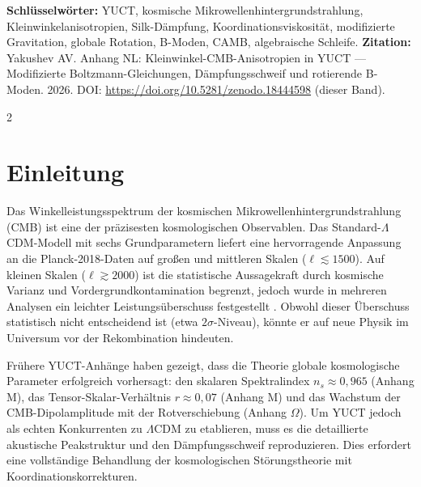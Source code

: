 \documentclass[11pt,a4paper]{article}
\begin{document}
	\vspace{0.1cm}
	\noindent
	{\color{darkblue}\textbf{Schlüsselwörter:}} YUCT, kosmische Mikrowellenhintergrundstrahlung, Kleinwinkelanisotropien, Silk-Dämpfung, Koordinationsviskosität, modifizierte Gravitation, globale Rotation, B-Moden, CAMB, algebraische Schleife.
	\vspace{0.1cm}
	\noindent
	{\color{darkblue}\textbf{Zitation:}} Yakushev AV. Anhang NL: Kleinwinkel-CMB-Anisotropien in YUCT — Modifizierte Boltzmann-Gleichungen, Dämpfungsschweif und rotierende B-Moden. 2026. DOI: \url{https://doi.org/10.5281/zenodo.18444598} (dieser Band).
	
	\vspace{0.4cm}
	
	\begin{multicols}{2}
		
		\section{Einleitung}
		
		Das Winkelleistungsspektrum der kosmischen Mikrowellenhintergrundstrahlung (CMB) ist eine der präzisesten kosmologischen Observablen. Das Standard-$\Lambda$CDM-Modell mit sechs Grundparametern liefert eine hervorragende Anpassung an die Planck-2018-Daten auf großen und mittleren Skalen ($\ell \lesssim 1500$). Auf kleinen Skalen ($\ell \gtrsim 2000$) ist die statistische Aussagekraft durch kosmische Varianz und Vordergrundkontamination begrenzt, jedoch wurde in mehreren Analysen ein leichter Leistungsüberschuss festgestellt \cite{Planck2018}. Obwohl dieser Überschuss statistisch nicht entscheidend ist (etwa $2\sigma$-Niveau), könnte er auf neue Physik im Universum vor der Rekombination hindeuten.
		
		Frühere YUCT-Anhänge haben gezeigt, dass die Theorie globale kosmologische Parameter erfolgreich vorhersagt: den skalaren Spektralindex $n_s \approx 0,965$ (Anhang M), das Tensor-Skalar-Verhältnis $r \approx 0,07$ (Anhang M) und das Wachstum der CMB-Dipolamplitude mit der Rotverschiebung (Anhang $\Omega$). Um YUCT jedoch als echten Konkurrenten zu $\Lambda$CDM zu etablieren, muss es die detaillierte akustische Peakstruktur und den Dämpfungsschweif reproduzieren. Dies erfordert eine vollständige Behandlung der kosmologischen Störungstheorie mit Koordinationskorrekturen.
		

\end{multicols}
\end{document}
